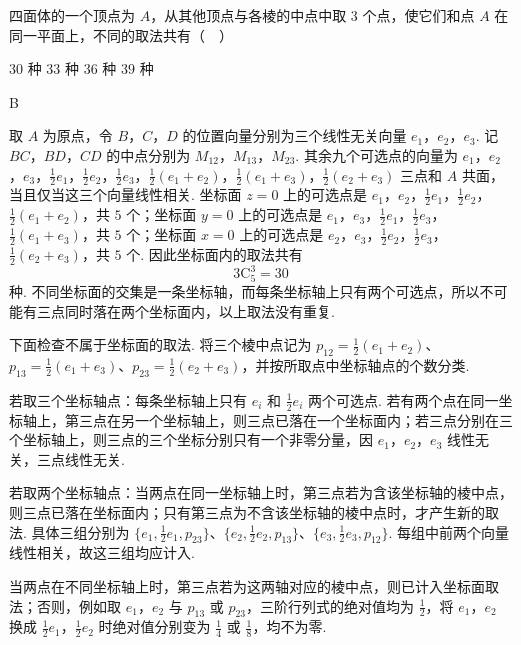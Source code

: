 \documentclass[UTF8,a4paper,oneside,11pt]{ctexbook}
\begin{document}
\begin{problem}
四面体的一个顶点为 \(A\)，从其他顶点与各棱的中点中取 \(3\) 个点，使它们和点 \(A\) 在同一平面上，不同的取法共有（\(\quad\)）

\choices
    {\(30\) 种}
    {\(33\) 种}
    {\(36\) 种}
    {\(39\) 种}

\end{problem}

\begin{answer}
B
\end{answer}

\begin{solution}
    取 \(A\) 为原点，令 \(B\)，\(C\)，\(D\) 的位置向量分别为三个线性无关向量 \(e_1\)，\(e_2\)，\(e_3\). 记 \(BC\)，\(BD\)，\(CD\) 的中点分别为 \(M_{12}\)，\(M_{13}\)，\(M_{23}\). 其余九个可选点的向量为
\(e_1\)，\(e_2\)，\(e_3\)，\(\frac12e_1\)，\(\frac12e_2\)，\(\frac12e_3\)，\(\frac12(e_1+e_2)\)，\(\frac12(e_1+e_3)\)，\(\frac12(e_2+e_3)\)
三点和 \(A\) 共面，当且仅当这三个向量线性相关. 坐标面 \(z=0\) 上的可选点是 \(e_1\)，\(e_2\)，\(\frac12e_1\)，\(\frac12e_2\)，\(\frac12(e_1+e_2)\)，共 \(5\) 个；坐标面 \(y=0\) 上的可选点是 \(e_1\)，\(e_3\)，\(\frac12e_1\)，\(\frac12e_3\)，\(\frac12(e_1+e_3)\)，共 \(5\) 个；坐标面 \(x=0\) 上的可选点是 \(e_2\)，\(e_3\)，\(\frac12e_2\)，\(\frac12e_3\)，\(\frac12(e_2+e_3)\)，共 \(5\) 个. 因此坐标面内的取法共有
\[
3\mathrm C_5^3=30
\]
种. 不同坐标面的交集是一条坐标轴，而每条坐标轴上只有两个可选点，所以不可能有三点同时落在两个坐标面内，以上取法没有重复.

下面检查不属于坐标面的取法. 将三个棱中点记为 \(p_{12}=\frac12(e_1+e_2)\)、\(p_{13}=\frac12(e_1+e_3)\)、\(p_{23}=\frac12(e_2+e_3)\)，并按所取点中坐标轴点的个数分类.

若取三个坐标轴点：每条坐标轴上只有 \(e_i\) 和 \(\frac12e_i\) 两个可选点. 若有两个点在同一坐标轴上，第三点在另一个坐标轴上，则三点已落在一个坐标面内；若三点分别在三个坐标轴上，则三点的三个坐标分别只有一个非零分量，因 \(e_1\)，\(e_2\)，\(e_3\) 线性无关，三点线性无关.

若取两个坐标轴点：当两点在同一坐标轴上时，第三点若为含该坐标轴的棱中点，则三点已落在坐标面内；只有第三点为不含该坐标轴的棱中点时，才产生新的取法. 具体三组分别为 \(\{e_1,\frac12e_1,p_{23}\}\)、\(\{e_2,\frac12e_2,p_{13}\}\)、\(\{e_3,\frac12e_3,p_{12}\}\). 每组中前两个向量线性相关，故这三组均应计入.

当两点在不同坐标轴上时，第三点若为这两轴对应的棱中点，则已计入坐标面取法；否则，例如取 \(e_1\)，\(e_2\) 与 \(p_{13}\) 或 \(p_{23}\)，三阶行列式的绝对值均为 \(\frac12\)，将 \(e_1\)，\(e_2\) 换成 \(\frac12e_1\)，\(\frac12e_2\) 时绝对值分别变为 \(\frac14\) 或 \(\frac18\)，均不为零.


\end{solution}
\end{document}
